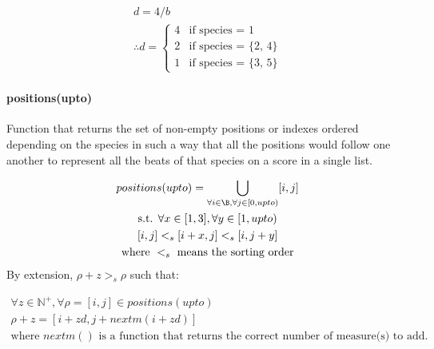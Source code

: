 \begin{equation}
    \begin{gathered}
        d = 4/b\\
        \therefore d = \begin{cases}
            4 & \text{if species = 1}\\
            2 & \text{if species = \{2, 4\}}\\
            1 & \text{if species = \{3, 5\}}
        \end{cases}
    \end{gathered}
\end{equation}

\paragraph{positions(upto)} Function that returns the set of non-empty positions or indexes ordered depending on the species in such a way that all the positions would follow one another to represent all the beats of that species on a score in a single list.

\begin{equation}
    \begin{gathered}
        positions(upto) = \bigcup _{\forall i \in \B, \forall j \in [0, upto)} [i, j]\\
        \text{s.t. } \forall x \in [1, 3], \forall y \in [1, upto)\\
        [i, j] <_{s} [i + x, j] <_{s} [i, j + y]\\
        \text{where } <_{s} \text{ means the sorting order}\\
    \end{gathered}
\end{equation}
By extension, $\rho + z >_{s} \rho$ such that:

\begin{equation}
    \begin{gathered}
        \forall z \in \mathbb{N}^+, \forall \rho = [i, j] \in positions(upto)\\
        \rho + z = [i + zd, j + nextm(i+zd)]\\
        \text{where } nextm() \text{ is a function that returns the correct number of measure(s) to add.}
    \end{gathered}
\end{equation}